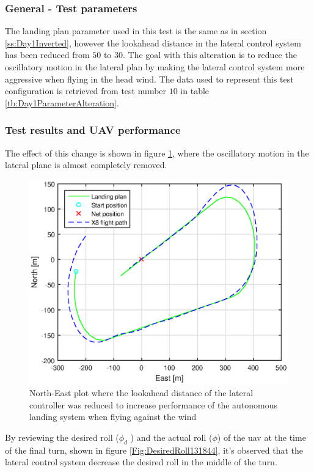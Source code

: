 \subsubsection{General - Test parameters}
The landing plan parameter used in this test is the same as in section \ref{ss:Day1Inverted}, however the lookahead distance in the lateral control system has been reduced from $50$ to $30$. The goal with this alteration is to reduce the oscillatory motion in the lateral plan by making the lateral control system more aggressive when flying in the head wind. The data used to represent this test configuration is retrieved from test number $10$ in table \ref{tb:Day1ParameterAlteration}.
\subsubsection{Test results and UAV performance}
The effect of this change is shown in figure \ref{Fig:NorthEast31mai131844}, where the oscillatory motion in the lateral plane is almost completely removed.
\begin{figure}[H]
\centering
\includegraphics[scale=0.7]{figs/Experiment/NorthEast31mai131844.eps}
\caption{North-East plot where the lookahead distance of the lateral controller was reduced to increase performance of the autonomous landing system when flying against the wind}
\label{Fig:NorthEast31mai131844}
\end{figure}
By reviewing the desired roll ($\phi_d$ ) and the actual roll ($\phi$) of the \gls{uav} at the time of the final turn, shown in figure \ref{Fig:DesiredRoll131844}, it's observed that the lateral control system decrease the desired roll in the middle of the turn.
